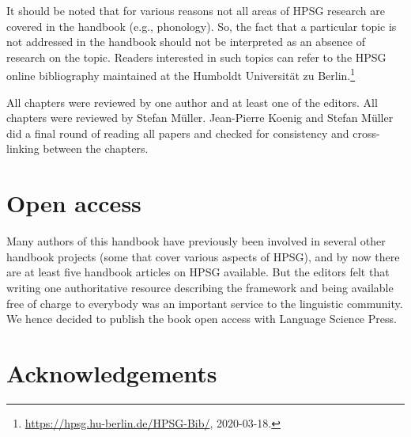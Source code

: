 \begin{refsection}
It should be noted that for various reasons not all areas of HPSG research are covered in the
handbook (e.g., phonology). So, the fact that a particular topic is not addressed in the handbook
should not be interpreted as an absence of research on the topic. Readers interested in such topics
can refer to the HPSG online bibliography maintained at the Humboldt Universität zu Berlin.\footnote{%
\url{https://hpsg.hu-berlin.de/HPSG-Bib/}, 2020-03-18.
}

All chapters were reviewed by one author and at least one of the editors. All chapters were reviewed
by Stefan Müller. Jean-Pierre Koenig and Stefan Müller did a final round of reading all papers and
checked for consistency and cross-linking between the chapters.


\section*{Open access}


Many authors of this handbook have previously been involved in several other handbook projects (some that cover various aspects of HPSG), and by now there are at least five handbook articles on HPSG available. But the editors felt that writing one authoritative resource describing the framework and being available free of charge to everybody was an important service to the linguistic community. We hence decided to publish the book open access with Language Science Press.


\section*{Acknowledgements}


\end{refsection}

